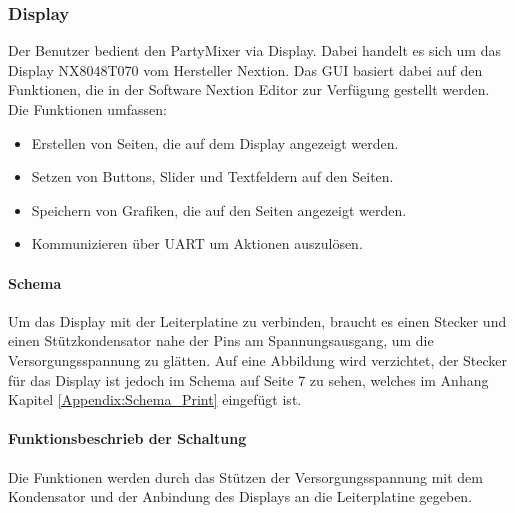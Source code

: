 \subsubsection{Display}
\label{subsubsec:Display}

Der Benutzer bedient den PartyMixer via Display. Dabei handelt es sich um das Display NX8048T070 vom Hersteller Nextion. Das GUI basiert dabei auf den Funktionen, die in der Software Nextion Editor zur Verfügung gestellt werden. Die Funktionen umfassen:
\begin{itemize}
\item Erstellen von Seiten, die auf dem Display angezeigt werden.
\item Setzen von Buttons, Slider und Textfeldern auf den Seiten.
\item Speichern von Grafiken, die auf den Seiten angezeigt werden.
\item Kommunizieren über UART um Aktionen auszulösen.
\end{itemize}

\paragraph{Schema}\mbox{}

Um das Display mit der Leiterplatine zu verbinden, braucht es einen Stecker und einen Stützkondensator nahe der Pins am Spannungsausgang, um die Versorgungsspannung zu glätten. Auf eine Abbildung wird verzichtet, der Stecker für das Display ist jedoch im Schema auf Seite 7 zu sehen, welches im Anhang Kapitel \ref{Appendix:Schema_Print} eingefügt ist.

\paragraph{Funktionsbeschrieb der Schaltung}\mbox{}

Die Funktionen werden durch das Stützen der Versorgungsspannung mit dem Kondensator und der Anbindung des Displays an die Leiterplatine gegeben.